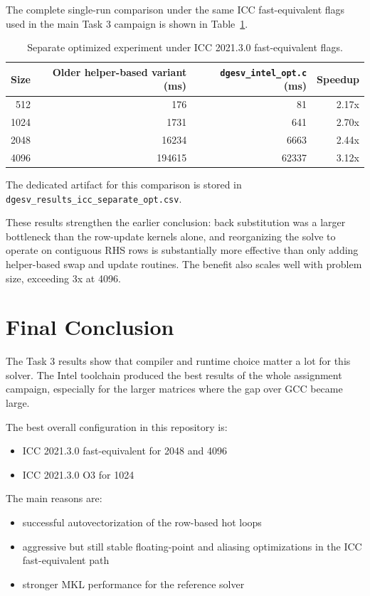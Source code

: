 \documentclass[11pt,a4paper]{article}
\begin{document}
\begin{enumerate}
The complete single-run comparison under the same ICC fast-equivalent flags
used in the main Task 3 campaign is shown in Table~\ref{tab:separate-opt}.

\begin{table}[h]
\centering
\begin{tabular}{rrrr}
\hline
Size & Older helper-based variant (ms) & \texttt{dgesv\_intel\_opt.c} (ms) & Speedup \\
\hline
512 & 176 & 81 & 2.17x \\
1024 & 1731 & 641 & 2.70x \\
2048 & 16234 & 6663 & 2.44x \\
4096 & 194615 & 62337 & 3.12x \\
\hline
\end{tabular}
\caption{Separate optimized experiment under ICC 2021.3.0 fast-equivalent flags.}
\label{tab:separate-opt}
\end{table}

The dedicated artifact for this comparison is stored in
\texttt{dgesv\_results\_icc\_separate\_opt.csv}.

These results strengthen the earlier conclusion: back substitution was a larger
bottleneck than the row-update kernels alone, and reorganizing the solve to
operate on contiguous RHS rows is substantially more effective than only adding
helper-based swap and update routines. The benefit also scales well with
problem size, exceeding 3x at 4096.
\end{enumerate}

\section{Final Conclusion}

The Task 3 results show that compiler and runtime choice matter a lot for this
solver. The Intel toolchain produced the best results of the whole assignment
campaign, especially for the larger matrices where the gap over GCC became
large.

The best overall configuration in this repository is:

\begin{itemize}
\item ICC 2021.3.0 fast-equivalent for 2048 and 4096
\item ICC 2021.3.0 O3 for 1024
\end{itemize}

The main reasons are:

\begin{itemize}
\item successful autovectorization of the row-based hot loops
\item aggressive but still stable floating-point and aliasing optimizations in the ICC fast-equivalent path
\item stronger MKL performance for the reference solver
\end{itemize}
\end{document}
